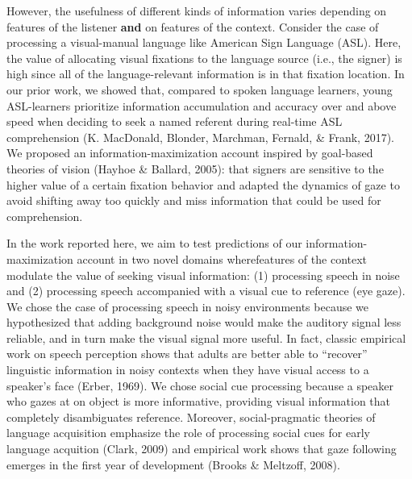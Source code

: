 \documentclass[10pt, letterpaper]{article}
\begin{document}
However, the usefulness of different kinds of information varies
depending on features of the listener \textbf{and} on features of the
context. Consider the case of processing a visual-manual language like
American Sign Language (ASL). Here, the value of allocating visual
fixations to the language source (i.e., the signer) is high since all of
the language-relevant information is in that fixation location. In our
prior work, we showed that, compared to spoken language learners, young
ASL-learners prioritize information accumulation and accuracy over and
above speed when deciding to seek a named referent during real-time ASL
comprehension (K. MacDonald, Blonder, Marchman, Fernald, \& Frank,
2017). We proposed an information-maximization account inspired by
goal-based theories of vision (Hayhoe \& Ballard, 2005): that signers
are sensitive to the higher value of a certain fixation behavior and
adapted the dynamics of gaze to avoid shifting away too quickly and miss
information that could be used for comprehension.

In the work reported here, we aim to test predictions of our
information-maximization account in two novel domains wherefeatures of
the context modulate the value of seeking visual information: (1)
processing speech in noise and (2) processing speech accompanied with a
visual cue to reference (eye gaze). We chose the case of processing
speech in noisy environments because we hypothesized that adding
background noise would make the auditory signal less reliable, and in
turn make the visual signal more useful. In fact, classic empirical work
on speech perception shows that adults are better able to ``recover''
linguistic information in noisy contexts when they have visual access to
a speaker's face (Erber, 1969). We chose social cue processing because a
speaker who gazes at on object is more informative, providing visual
information that completely disambiguates reference. Moreover,
social-pragmatic theories of language acquisition emphasize the role of
processing social cues for early language acquition (Clark, 2009) and
empirical work shows that gaze following emerges in the first year of
development (Brooks \& Meltzoff, 2008).
\end{document}
